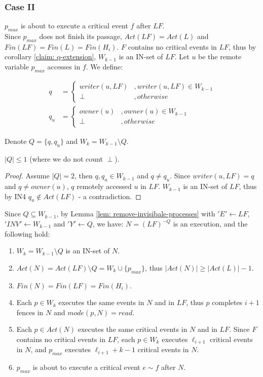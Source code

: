 \subsubsection*{\hspace{5mm} Case II}
$p_{max}$ is about to execute a critical event $f$ after $L F$.
\\ Since $p_{max}$ does not finish its passage, $Act(L F) = Act(L)$ and $Fin(L F) = Fin(L) = Fin(H_i)$. $F$ contains no critical events in $L F$, thus by corollary \ref{claim: q-extension}, $W_{k-1}$ is an IN-set of $L F$. Let $u$ be the remote variable $p_{max}$ accesses in $f$. We define:

\begin{align*}
q & = \begin{cases}
	writer(u, L F) & ,writer(u, L F) \in W_{k-1}
	\\ \perp & ,otherwise
	\end{cases}
\\
q_u & = \begin{cases}
	owner(u) & ,owner(u) \in W_{k-1}
	\\ \perp & ,otherwise
	\end{cases}
\end{align*}

Denote $Q = \{q,q_u\}$ and $W_k = W_{k-1} \setminus Q$.
\begin{claim-subsection}
\label{claim:subsection}
	$|Q| \leq 1$ (where we do not count $\perp$).
\end{claim-subsection}
\begin{proof}
	Assume $|Q| = 2$, then $q,q_u \in W_{k-1}$ and $q \neq q_u$. Since $writer(u, L F) = q$ and $q \neq owner(u)$, $q$ remotely accessed $u$ in $L F$. $W_{k-1}$ is an IN-set of $L F$, thus by IN4 $q_u \notin Act(L F)$ - a contradiction.
\end{proof}

Since $Q \subseteq W_{k-1}$, by Lemma \ref{lem: remove-invisibale-processes} with $'E' \leftarrow L F$, $'INV' \leftarrow W_{k-1}$ and $'Y' \leftarrow Q$, we have: $N = (L F)^{-Q}$ is an execution, and the following hold:
\begin{enumerate}
	\item $W_k = W_{k-1} \setminus Q$ is an IN-set of $N$.
	\item $Act(N) = Act(L F) \setminus Q = W_k \cup \{p_{max}\}$, thus $|Act(N)| \geq |Act(L)| - 1$.
	\item $Fin(N) = Fin(L F) = Fin(H_i)$.
	\item Each $p \in W_k$ executes the same events in $N$ and in $L F$, thus $p$ completes $i+1$ fences in $N$ and $mode(p,N) = read$.
	\item Each $p \in Act(N)$ executes the same critical events in $N$ and in $L F$. Since $F$ contains no critical events in $L F$, each $p \in W_k$ executes $\ell_{i+1}$ critical events in $N$, and $p_{max}$ executes $\ell_{i+1}+k-1$ critical events in $N$.
	\item $p_{max}$ is about to execute a critical event $e \sim f$ after $N$.
\end{enumerate}

